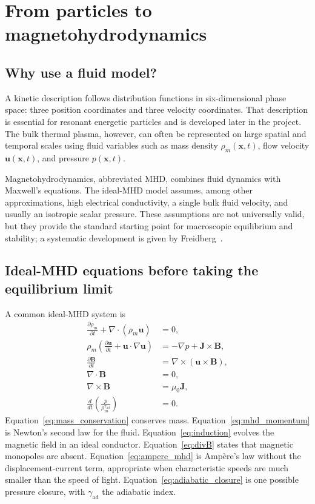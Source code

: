 \section{From particles to magnetohydrodynamics}
\label{sec:mhd_model}

\subsection{Why use a fluid model?}
A kinetic description follows distribution functions in six-dimensional phase space: three position coordinates and three velocity coordinates. That description is essential for resonant energetic particles and is developed later in the project. The bulk thermal plasma, however, can often be represented on large spatial and temporal scales using fluid variables such as mass density $\rho_m(\mathbf x,t)$, flow velocity $\mathbf u(\mathbf x,t)$, and pressure $p(\mathbf x,t)$.

Magnetohydrodynamics, abbreviated MHD, combines fluid dynamics with Maxwell's equations. The ideal-MHD model assumes, among other approximations, high electrical conductivity, a single bulk fluid velocity, and usually an isotropic scalar pressure. These assumptions are not universally valid, but they provide the standard starting point for macroscopic equilibrium and stability; a systematic development is given by Freidberg~\cite{freidberg2014}.

\subsection{Ideal-MHD equations before taking the equilibrium limit}
A common ideal-MHD system is
\begin{align}
\frac{\partial \rho_m}{\partial t}+\nabla\cdot(\rho_m\mathbf u)&=0,
\label{eq:mass_conservation}\\
\rho_m\left(\frac{\partial \mathbf u}{\partial t}+\mathbf u\cdot\nabla\mathbf u\right)&=-\nabla p+\mathbf J\times\mathbf B,
\label{eq:mhd_momentum}\\
\frac{\partial \mathbf B}{\partial t}&=\nabla\times(\mathbf u\times\mathbf B),
\label{eq:induction}\\
\nabla\cdot\mathbf B&=0,
\label{eq:divB}\\
\nabla\times\mathbf B&=\mu_0\mathbf J,
\label{eq:ampere_mhd}\\
\frac{d}{dt}\left(\frac{p}{\rho_m^{\gamma_{\mathrm{ad}}}}\right)&=0.
\label{eq:adiabatic_closure}
\end{align}
Equation~\eqref{eq:mass_conservation} conserves mass. Equation~\eqref{eq:mhd_momentum} is Newton's second law for the fluid. Equation~\eqref{eq:induction} evolves the magnetic field in an ideal conductor. Equation~\eqref{eq:divB} states that magnetic monopoles are absent. Equation~\eqref{eq:ampere_mhd} is Amp\`ere's law without the displacement-current term, appropriate when characteristic speeds are much smaller than the speed of light. Equation~\eqref{eq:adiabatic_closure} is one possible pressure closure, with $\gamma_{\mathrm{ad}}$ the adiabatic index.

